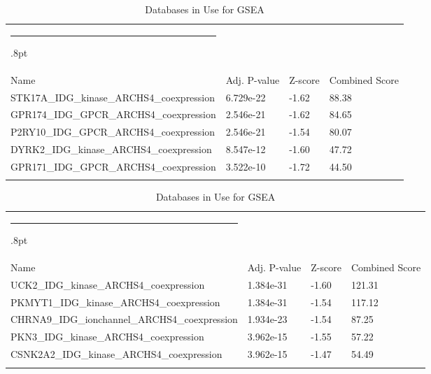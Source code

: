 \documentclass[3p,authoryear,preprint,12pt]{elsarticle}
\makeatletter
\def\hlinewd#1{%
  \noalign{\ifnum0=`}\fi\hrule \@height #1%
  \futurelet\reserved@a\@xhline}
\def\tbltoprule{\hlinewd{.8pt}\\[-12pt]}
\def\tblbottomrule{\noalign{\vspace*{6pt}}\hline\noalign{\vspace*{2pt}}}
\def\tblmidrule{\noalign{\vspace*{6pt}}\hline\noalign{\vspace*{2pt}}}
\makeatother
\begin{document}
\begin{table}[!htbp]
	\caption{{Databases in Use for GSEA} }
	\label{tw-de478ae31cc6}
	\def\arraystretch{1}
	\ignorespaces 
	\centering 
	\begin{tabulary}{\linewidth}{p{\dimexpr.65\tabcolsep}p{\dimexpr.15\tabcolsep}p{\dimexpr.1\tabcolsep}p{\dimexpr.1\tabcolsep}}
		\tbltoprule Name & Adj. P-value & Z-score & Combined Score\\
		\tblmidrule
STK17A\_IDG\_kinase\_ARCHS4\_coexpression & 6.729e-22 & -1.62 & 88.38 \\
GPR174\_IDG\_GPCR\_ARCHS4\_coexpression & 2.546e-21 & -1.62 & 84.65 \\
P2RY10\_IDG\_GPCR\_ARCHS4\_coexpression & 2.546e-21 & -1.54 & 80.07 \\
DYRK2\_IDG\_kinase\_ARCHS4\_coexpression & 8.547e-12 & -1.60 & 47.72 \\
GPR171\_IDG\_GPCR\_ARCHS4\_coexpression & 3.522e-10 & -1.72 & 44.50 \\
		\tblbottomrule
	\end{tabulary}\par 
\end{table}
\begin{table}[!htbp]
	\caption{{Databases in Use for GSEA} }
	\label{tw-de478ae31cc6}
	\def\arraystretch{1}
	\ignorespaces 
	\centering 
	\begin{tabulary}{\linewidth}{p{\dimexpr.65\tabcolsep}p{\dimexpr.15\tabcolsep}p{\dimexpr.1\tabcolsep}p{\dimexpr.1\tabcolsep}}
		\tbltoprule Name & Adj. P-value & Z-score & Combined Score\\
		\tblmidrule
UCK2\_IDG\_kinase\_ARCHS4\_coexpression & 1.384e-31 & -1.60 & 121.31 \\
PKMYT1\_IDG\_kinase\_ARCHS4\_coexpression & 1.384e-31 & -1.54 & 117.12 \\
CHRNA9\_IDG\_ionchannel\_ARCHS4\_coexpression & 1.934e-23 & -1.54 & 87.25 \\
PKN3\_IDG\_kinase\_ARCHS4\_coexpression & 3.962e-15 & -1.55 & 57.22 \\
CSNK2A2\_IDG\_kinase\_ARCHS4\_coexpression & 3.962e-15 & -1.47 & 54.49 \\
		\tblbottomrule
	\end{tabulary}\par 
\end{table}
\end{document}
